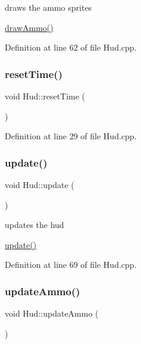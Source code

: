 draws the ammo sprites 

\hyperlink{class_hud_a88e6f0b9be11e3aa59b7b4ab14d98ffa}{draw\+Ammo()} 

Definition at line 62 of file Hud.\+cpp.

\mbox{\label{class_hud_a2404ab603f0646b3b320616e7dfbc957}} 
\subsubsection{\texorpdfstring{reset\+Time()}{resetTime()}}
{\footnotesize\ttfamily void Hud\+::reset\+Time (\begin{DoxyParamCaption}{ }\end{DoxyParamCaption})}



Definition at line 29 of file Hud.\+cpp.

\mbox{\label{class_hud_af9ec2f89bcc54651d2413aeb5cbc53b3}} 
\subsubsection{\texorpdfstring{update()}{update()}}
{\footnotesize\ttfamily void Hud\+::update (\begin{DoxyParamCaption}{ }\end{DoxyParamCaption})}



updates the hud 

\hyperlink{class_hud_af9ec2f89bcc54651d2413aeb5cbc53b3}{update()} 

Definition at line 69 of file Hud.\+cpp.

\mbox{\label{class_hud_a9fdcb19f4fd4d323dc7b3dd09bd85a08}} 
\subsubsection{\texorpdfstring{update\+Ammo()}{updateAmmo()}}
{\footnotesize\ttfamily void Hud\+::update\+Ammo (\begin{DoxyParamCaption}{ }\end{DoxyParamCaption})}



